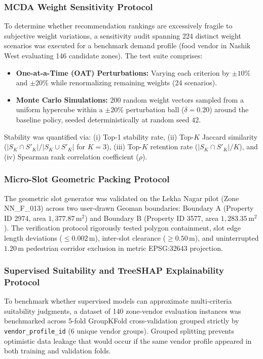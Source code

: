 \subsubsection{MCDA Weight Sensitivity Protocol}
To determine whether recommendation rankings are excessively fragile to subjective weight variations, a sensitivity audit spanning 224 distinct weight scenarios was executed for a benchmark demand profile (food vendor in Nashik West evaluating 146 candidate zones). The test suite comprises:
\begin{itemize}
    \item \textbf{One-at-a-Time (OAT) Perturbations:} Varying each criterion by $\pm 10\%$ and $\pm 20\%$ while renormalizing remaining weights (24 scenarios).
    \item \textbf{Monte Carlo Simulations:} 200 random weight vectors sampled from a uniform hypercube within a $\pm 20\%$ perturbation ball ($\delta = 0.20$) around the baseline policy, seeded deterministically at random seed 42.
\end{itemize}
Stability was quantified via: (i) Top-1 stability rate, (ii) Top-$K$ Jaccard similarity ($|S_K \cap S'_K| / |S_K \cup S'_K|$ for $K=3$), (iii) Top-$K$ retention rate ($|S_K \cap S'_K| / K$), and (iv) Spearman rank correlation coefficient ($\rho$).

\subsubsection{Micro-Slot Geometric Packing Protocol}
The geometric slot generator was validated on the Lekha Nagar pilot (Zone NN\_F\_013) across two user-drawn Geoman boundaries: Boundary A (Property ID 2974, area $1,377.87\,\text{m}^2$) and Boundary B (Property ID 3577, area $1,283.35\,\text{m}^2$). The verification protocol rigorously tested polygon containment, slot edge length deviations ($\le 0.002\,\text{m}$), inter-slot clearance ($\ge 0.50\,\text{m}$), and uninterrupted $1.20\,\text{m}$ pedestrian corridor exclusion in metric EPSG:32643 projection.

\subsubsection{Supervised Suitability and TreeSHAP Explainability Protocol}
To benchmark whether supervised models can approximate multi-criteria suitability judgments, a dataset of 140 zone-vendor evaluation instances was benchmarked across 5-fold GroupKFold cross-validation grouped strictly by \texttt{vendor\_profile\_id} (6 unique vendor groups). Grouped splitting prevents optimistic data leakage that would occur if the same vendor profile appeared in both training and validation folds. 

